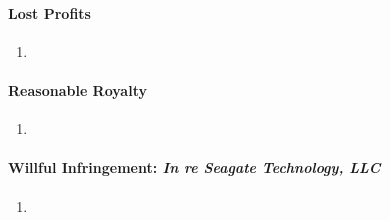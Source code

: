 \paragraph{Lost Profits} %

\begin{enumerate}
    \item 
\end{enumerate}

\paragraph{Reasonable Royalty} %

\begin{enumerate}
    \item 
\end{enumerate}

\paragraph{Willful Infringement: \emph{In re Seagate Technology, LLC}} %

\begin{enumerate}
    \item 
\end{enumerate}
